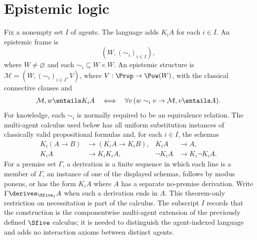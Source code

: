 \section{Epistemic logic}
\label{sec:modal-temporal-epistemic-03}

Fix a nonempty set \(I\) of agents.  The language adds \(K_iA\) for each
\(i\in I\).  An epistemic frame is
\[
  (W,(\sim_i)_{i\in I}),
\]
where \(W\ne\varnothing\) and each
\(\sim_i\subseteq W\times W\).  An epistemic structure is
\(\mathcal M=(W,(\sim_i)_{i\in I},V)\), where
\(V:\Prop\to\Pow(W)\), with the classical connective clauses and
\[
  \mathcal M,w\entails K_iA
  \quad\Longleftrightarrow\quad
  \forall v\,(w\sim_i v\to\mathcal M,v\entails A).
\]
For knowledge, each \(\sim_i\) is normally required to be an equivalence
relation.  The multi-agent calculus used below has all uniform substitution
instances of classically valid propositional formulas and, for each
\(i\in I\), the
schemas
\[
\begin{aligned}
  K_i(A\to B)&\to(K_iA\to K_iB),&
  K_iA&\to A,\\
  K_iA&\to K_iK_iA,&
  \neg K_iA&\to K_i\neg K_iA.
\end{aligned}
\]
For a premise set \(\Gamma\), a derivation is a finite sequence in which each
line is a member of \(\Gamma\), an instance of one of the displayed schemas,
follows by modus ponens, or has the form \(K_iA\) where \(A\) has a separate
no-premise derivation.  Write \(\Gamma\derives_{\Sfive_I}A\) when such a
derivation ends in \(A\).  This theorem-only restriction on necessitation is
part of the calculus.  The subscript \(I\) records that the construction is the
componentwise multi-agent extension of the previously defined \(\Sfive\)
calculus; it is needed to distinguish the agent-indexed language and adds no
interaction axioms between distinct agents.

